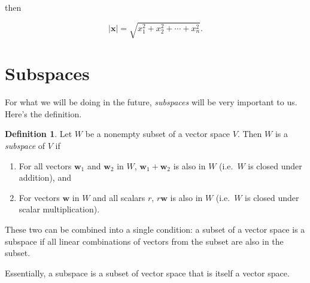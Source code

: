 \documentclass[
]{book}
\theoremstyle{definition}
\newtheorem{definition}{Definition}[chapter]
\theoremstyle{definition}
\theoremstyle{definition}
\theoremstyle{definition}
\theoremstyle{remark}
\begin{document}
then

\[|\mathbf{x}|=\sqrt{x_1^2+x_2^2+\cdots+x_n^2}.\]

\section{Subspaces}\label{subspaces}

For what we will be doing in the future, \emph{subspaces} will be very important to us. Here's the definition.

\begin{defbox}

\begin{definition}
\protect\hypertarget{def:SubspaceDef}{}\label{def:SubspaceDef}Let \(W\) be a nonempty subset of a vector space \(V\). Then \(W\) is a \emph{subspace} of \(V\) if

\begin{enumerate}
\def\labelenumi{\arabic{enumi}.}
\item
  For all vectors \(\mathbf{w}_1\) and \(\mathbf{w}_2\) in \(W\), \(\mathbf{w}_1+\mathbf{w}_2\) is also in \(W\) (i.e.~\(W\) is closed under addition), and
\item
  For vectors \(\mathbf{w}\) in \(W\) and all scalars \(r\), \(r\mathbf{w}\) is also in \(W\) (i.e.~\(W\) is closed under scalar multiplication).
\end{enumerate}

These two can be combined into a single condition: a subset of a vector space is a subspace if all linear combinations of vectors from the subset are also in the subset.
\end{definition}

\end{defbox}

Essentially, a subspace is a subset of vector space that is itself a vector space.
\end{document}
